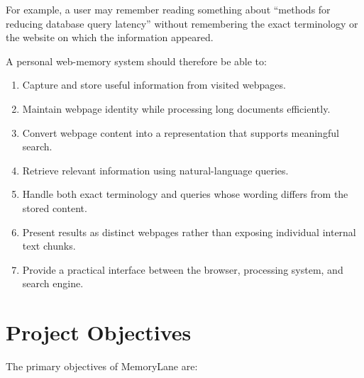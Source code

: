 \documentclass{tietreport}
\begin{document}
For example, a user may remember reading something about
``methods for reducing database query latency'' without
remembering the exact terminology or the website on which the
information appeared.

A personal web-memory system should therefore be able to:

\begin{enumerate}
    \item Capture and store useful information from visited
    webpages.

    \item Maintain webpage identity while processing long
    documents efficiently.

    \item Convert webpage content into a representation that
    supports meaningful search.

    \item Retrieve relevant information using natural-language
    queries.

    \item Handle both exact terminology and queries whose
    wording differs from the stored content.

    \item Present results as distinct webpages rather than
    exposing individual internal text chunks.

    \item Provide a practical interface between the browser,
    processing system, and search engine.
\end{enumerate}

\section{Project Objectives}

The primary objectives of MemoryLane are:
\end{document}
